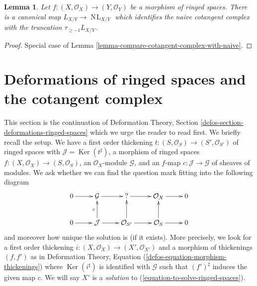 \documentclass{stacks-project}
\theoremstyle{plain}
\newtheorem{lemma}[subsection]{Lemma}
\theoremstyle{definition}
\theoremstyle{remark}
\numberwithin{equation}{subsection}
\def\NL{\mathop{N\!L}\nolimits}
\def\Ker{\mathop{\mathrm{Ker}}}
\begin{document}
\begin{lemma}
\label{lemma-compare-cotangent-complex-with-naive-ringed-spaces}
Let $f : (X, \mathcal{O}_X) \to (Y, \mathcal{O}_Y)$ be a morphism of
ringed spaces. There is a canonical map $L_{X/Y} \to \NL_{X/Y}$ which
identifies the naive cotangent complex with the truncation
$\tau_{\geq -1}L_{X/Y}$.
\end{lemma}

\begin{proof}
Special case of Lemma \ref{lemma-compare-cotangent-complex-with-naive}.
\end{proof}






\section{Deformations of ringed spaces and the cotangent complex}
\label{section-deformations-ringed-spaces}

\noindent
This section is the continuation of
Deformation Theory, Section \ref{defos-section-deformations-ringed-spaces}
which we urge the reader to read first. We briefly recall the setup.
We have a first order thickening
$t : (S, \mathcal{O}_S) \to (S', \mathcal{O}_{S'})$ of ringed spaces
with $\mathcal{J} = \Ker(t^\sharp)$, a morphism of ringed spaces
$f : (X, \mathcal{O}_X) \to (S, \mathcal{O}_S)$, an $\mathcal{O}_X$-module
$\mathcal{G}$, and an $f$-map $c : \mathcal{J} \to \mathcal{G}$
of sheaves of modules. We ask whether we can find
the question mark fitting into the following diagram
\begin{equation}
\label{equation-to-solve-ringed-spaces}
\vcenter{
\xymatrix{
0 \ar[r] & \mathcal{G} \ar[r] & {?} \ar[r] & \mathcal{O}_X \ar[r] & 0 \\
0 \ar[r] & \mathcal{J} \ar[u]^c \ar[r] & \mathcal{O}_{S'} \ar[u] \ar[r] &
\mathcal{O}_S \ar[u] \ar[r] & 0
}
}
\end{equation}
and moreover how unique the solution is (if it exists). More precisely,
we look for a first order thickening
$i : (X, \mathcal{O}_X) \to (X', \mathcal{O}_{X'})$
and a morphism of thickenings $(f, f')$ as in
Deformation Theory, Equation (\ref{defos-equation-morphism-thickenings})
where $\Ker(i^\sharp)$ is identified with $\mathcal{G}$
such that $(f')^\sharp$ induces the given map $c$.
We will say $X'$ is a {\it solution} to
(\ref{equation-to-solve-ringed-spaces}).
\end{document}
